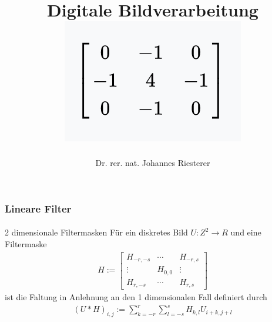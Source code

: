 \documentclass{beamer}
\begin{document}
\title[Digitale Bildverarbeitung] %
{Digitale Bildverarbeitung
\\
\includegraphics[scale=1.0]{img/cover}
}
\subtitle{}
\author[Dr. Johannes Riesterer] %
{Dr.  rer. nat. Johannes Riesterer}

\date[KPT 2004] %
{}

\subject{Digitale Bildverarbeitung}

\frame{\titlepage}


\begin{frame}
    \frametitle{Lineare Filter}
\framesubtitle{}

\begin{block}{2 dimensionale Filtermasken}
Für ein diskretes Bild $U: Z^2 \to R$ und eine Filtermaske 
\begin{align*}
H := \begin{bmatrix} 
    H_{-r, -s} & \cdots  & H_{-r, s} \\
     \vdots & H_{0, 0} & \vdots						\\
	H_{r, -s} & \cdots & H_{r, s} 
\end{bmatrix}
\end{align*}
ist die Faltung in Anlehnung an den 1 dimensionalen Fall definiert durch
\begin{align*}
(U * H)_{i ,j}:=  \sum_{k = -r}^{r} \sum_{l = -s}^{s} H_{k,l} U_{i+k, j+l}
\end{align*}

\end{block}

 \end{frame}
\end{document}
